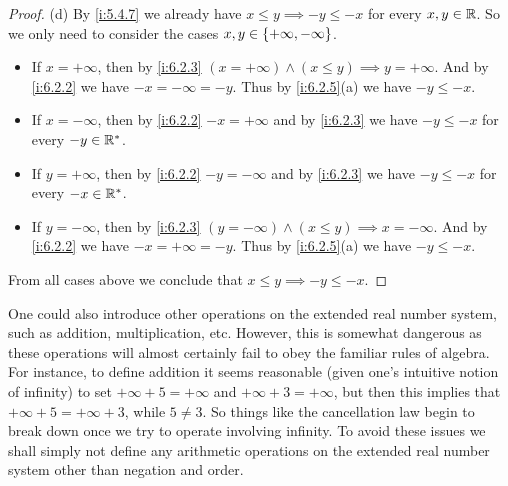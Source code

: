 \begin{proof}{(d)}
  By \cref{i:5.4.7} we already have \(x \leq y \implies -y \leq -x\) for every \(x, y \in \mathbb{R}\).
  So we only need to consider the cases \(x, y \in \left\lbrace+\infty, -\infty\right\rbrace\).
  \begin{itemize}
    \item If \(x = +\infty\), then by \cref{i:6.2.3} \((x = +\infty) \land (x \leq y) \implies y = +\infty\).
          And by \cref{i:6.2.2} we have \(-x = -\infty = -y\).
          Thus by \cref{i:6.2.5}(a) we have \(-y \leq -x\).
    \item If \(x = -\infty\), then by \cref{i:6.2.2} \(-x = +\infty\) and by \cref{i:6.2.3} we have \(-y \leq -x\) for every \(-y \in \mathbb{R}^*\).
    \item If \(y = +\infty\), then by \cref{i:6.2.2} \(-y = -\infty\) and by \cref{i:6.2.3} we have \(-y \leq -x\) for every \(-x \in \mathbb{R}^*\).
    \item If \(y = -\infty\), then by \cref{i:6.2.3} \((y = -\infty) \land (x \leq y) \implies x = -\infty\).
          And by \cref{i:6.2.2} we have \(-x = +\infty = -y\).
          Thus by \cref{i:6.2.5}(a) we have \(-y \leq -x\).
  \end{itemize}
  From all cases above we conclude that \(x \leq y \implies -y \leq -x\).
\end{proof}

\begin{note}
  One could also introduce other operations on the extended real number system, such as addition, multiplication, etc.
  However, this is somewhat dangerous as these operations will almost certainly fail to obey the familiar rules of algebra.
  For instance, to define addition it seems reasonable (given one's intuitive notion of infinity) to set \(+\infty + 5 = +\infty\) and \(+\infty + 3 = +\infty\), but then this implies that \(+\infty + 5 = +\infty + 3\), while \(5 \neq 3\).
  So things like the cancellation law begin to break down once we try to operate involving infinity.
  To avoid these issues we shall simply not define any arithmetic operations on the extended real number system other than negation and order.
\end{note}

